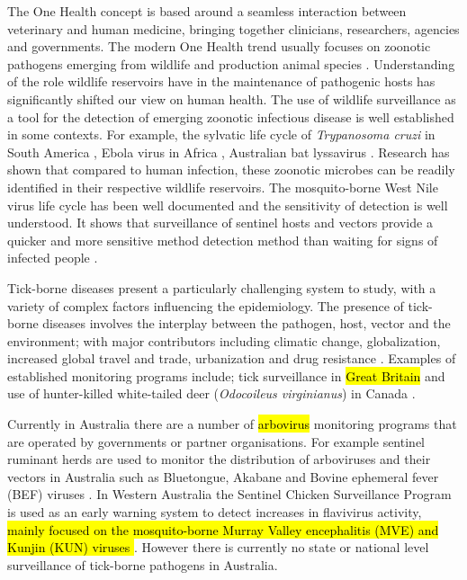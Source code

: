 \documentclass[a4paper, nobind]{templates/ociamthesis}
\begin{document}
The One Health concept is based around a seamless interaction between veterinary and human medicine, bringing together clinicians, researchers, agencies and governments.
The modern One Health trend usually focuses on zoonotic pathogens emerging from wildlife and production animal species \autocite{dayOneHealthImportance2011}.
Understanding of the role wildlife reservoirs have in the maintenance of pathogenic hosts has significantly shifted our view on human health.
The use of wildlife surveillance as a tool for the detection of emerging zoonotic infectious disease is well established in some contexts.
For example, the sylvatic life cycle of \emph{Trypanosoma cruzi} in South America \autocite{denoyaEcologicalOverviewFactors2015}, Ebola virus in Africa \autocite{osterholmTransmissionEbolaViruses2015}, Australian bat lyssavirus \autocite{mayIdentificationFocusAreas2020}.
Research has shown that compared to human infection, these zoonotic microbes can be readily identified in their respective wildlife reservoirs.
The mosquito-borne West Nile virus life cycle has been well documented and the sensitivity of detection is well understood.
It shows that surveillance of sentinel hosts and vectors provide a quicker and more sensitive method detection method than waiting for signs of infected people \autocite{lemonGlobalInfectiousDisease2007}.

Tick-borne diseases present a particularly challenging system to study, with a variety of complex factors influencing the epidemiology.
The presence of tick-borne diseases involves the interplay between the pathogen, host, vector and the environment; with major contributors including climatic change, globalization, increased global travel and trade, urbanization and drug resistance \autocite{dantas-torresClimateChangeBiodiversity2015,kulesChallengesAdvancesDiagnosis2017,gilbertImpactsClimateChange2021}.
Examples of established monitoring programs include; tick surveillance in \hl{Great Britain} \autocite{jamesonTickSurveillanceGreat2011,cullSurveillanceBritishTicks2018} and use of hunter-killed white-tailed deer (\emph{Odocoileus virginianus}) in Canada \autocite{bouchardHarvestedWhitetailedDeer2013}.

Currently in Australia there are a number of \hl{arbovirus} monitoring programs that are operated by governments or partner organisations.
For example sentinel ruminant herds are used to monitor the distribution of arboviruses and their vectors in Australia such as Bluetongue, Akabane and Bovine ephemeral fever (BEF) viruses \autocite{nationalarbovirusmonitoringprogramNationalArbovirusMonitoring2019}.
In Western Australia the Sentinel Chicken Surveillance Program is used as an early warning system to detect increases in flavivirus activity, \hl{mainly focused on the mosquito-borne Murray Valley encephalitis (MVE) and Kunjin (KUN) viruses \autocite{departmentofhealthMedicalEntomologyAnnual2020}}.
However there is currently no state or national level surveillance of tick-borne pathogens in Australia.
\end{document}
